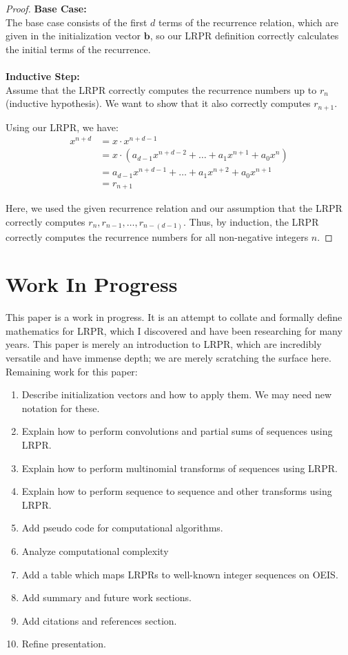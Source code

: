 \documentclass{article}
\theoremstyle{plain}
\begin{document}
\begin{proof}
\textbf{Base Case:}
\\
    The base case consists of the first \(d\) terms of the recurrence relation, which are given in the initialization vector \( \mathbf{b} \), so our LRPR definition correctly calculates the initial terms of the recurrence.
\\
\\
\textbf{Inductive Step:}
\\
    Assume that the LRPR correctly computes the recurrence numbers up to \( r_n \) (inductive hypothesis). We want to show that it also correctly computes \( r_{n+1} \).
    
    Using our LRPR, we have:
    \begin{align*}
    x^{n+d} &= x \cdot x^{n+d-1} \\
            &= x \cdot (a_{d-1}x^{n+d-2} + \ldots + a_1x^{n+1} + a_0x^n) \\
            &= a_{d-1}x^{n+d-1} + \ldots + a_1x^{n+2} + a_0x^{n+1} \\
            &= r_{n+1}
    \end{align*}
    
    Here, we used the given recurrence relation and our assumption that the LRPR correctly computes \( r_n, r_{n-1}, \ldots, r_{n-(d-1)} \). Thus, by induction, the LRPR correctly computes the recurrence numbers for all non-negative integers \( n \).
\end{proof}

\section{Work In Progress}
This paper is a work in progress. It is an attempt to collate and formally define mathematics for LRPR, which I discovered and have been researching for many years. This paper is merely an introduction to LRPR, which are incredibly versatile and have immense depth; we are merely scratching the surface here. Remaining work for this paper:
\begin{enumerate}
    \item Describe initialization vectors and how to apply them. We may need new notation for these.
    \item Explain how to perform convolutions and partial sums of sequences using LRPR.
    \item Explain how to perform multinomial transforms of sequences using LRPR.
    \item Explain how to perform sequence to sequence and other transforms using LRPR.
    \item Add pseudo code for computational algorithms.
    \item Analyze computational complexity
    \item Add a table which maps LRPRs to well-known integer sequences on OEIS.
    \item Add summary and future work sections.
    \item Add citations and references section.
    \item Refine presentation.

\end{enumerate}
\end{document}
